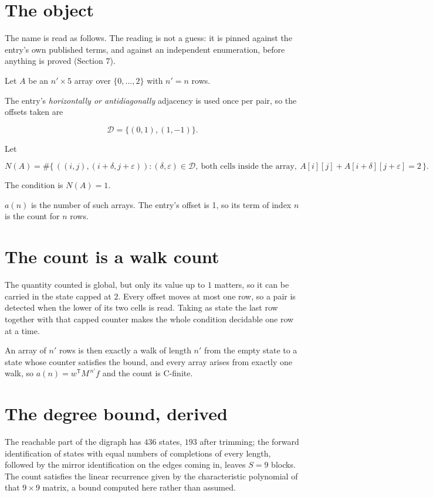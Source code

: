 \documentclass[11pt]{article}
\theoremstyle{definition}
\begin{document}
\section{The object}

The name is read as follows. The reading is not a guess: it is pinned against the entry's own published terms, and against an independent enumeration, before anything is proved (Section 7).

Let $A$ be an $n' \times 5$ array over $\{0,\dots,2\}$ with $n' = n$ rows.

The entry's {\itshape horizontally or antidiagonally} adjacency is used once per pair, so the offsets taken are

\[\mathcal{D} = \{(0,1), (1,-1)\}.\]

Let

\[N(A) = \#\bigl\{\,((i,j),(i{+}\delta,j{+}\varepsilon)) : (\delta,\varepsilon) \in \mathcal{D},\ \text{both cells inside the array},\ A[i][j] + A[i{+}\delta][j{+}\varepsilon] = 2\,\bigr\}.\]

The condition is $N(A) = 1$.

$a(n)$ is the number of such arrays. The entry's offset is 1, so its term of index $n$ is the count for $n$ rows.

\section{The count is a walk count}

The quantity counted is global, but only its value up to $1$ matters, so it can be carried in the state capped at $2$. Every offset moves at most one row, so a pair is detected when the lower of its two cells is read. Taking as state the last row together with that capped counter makes the whole condition decidable one row at a time.

An array of $n'$ rows is then exactly a walk of length $n'$ from the empty state to a state whose counter satisfies the bound, and every array arises from exactly one walk, so $a(n) = w^{\mathsf T}M^{\,n'}f$ and the count is C-finite.

\section{The degree bound, derived}

The reachable part of the digraph has $436$ states, $193$ after trimming; the forward identification of states with equal numbers of completions of every length, followed by the mirror identification on the edges coming in, leaves $S = 9$ blocks. The count satisfies the linear recurrence given by the characteristic polynomial of that $9\times9$ matrix, a bound computed here rather than assumed.
\end{document}
